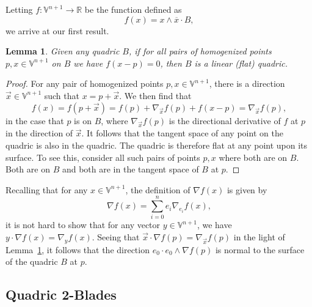 \documentclass{ecgd-l}
\newtheorem{lemma}[theorem]{Lemma}
\theoremstyle{definition}
\theoremstyle{remark}
\numberwithin{equation}{section}
\newcommand{\V}{\mathbb{V}}
\newcommand{\R}{\mathbb{R}}
\begin{document}
Letting $f:\V^{n+1}\to\R$ be the function defined as
\begin{equation}
f(x) = x\wedge\overline{x}\cdot B,
\end{equation}
we arrive at our first result.
\begin{lemma}\label{lma_flat_quadric}
Given any quadric $B$, if for all pairs of homogenized points $p,x\in\V^{n+1}$ on $B$
we have $f(x-p)=0$, then $B$ is a linear (flat) quadric.
\end{lemma}
\begin{proof}
For any pair of homogenized points $p,x\in\V^{n+1}$, there is a direction $\vec{x}\in\V^{n+1}$
such that $x=p+\vec{x}$.  We then find that
\begin{equation}
f(x) = f(p+\vec{x}) = f(p) + \nabla_{\vec{x}}f(p) + f(x-p) = \nabla_{\vec{x}}f(p),
\end{equation}
in the case that $p$ is on $B$, where $\nabla_{\vec{x}}f(p)$ is the directional
derivative of $f$ at $p$ in the direction of $\vec{x}$.  It follows that the tangent
space of any point on the quadric is also in the quadric.  The quadric is therefore
flat at any point upon its surface.  To see this, consider all such pairs of points $p,x$ where
both are on $B$.  Both are on $B$ and both are in the tangent space of $B$ at $p$.
\end{proof}
Recalling that for any $x\in\V^{n+1}$, the definition of $\nabla f(x)$ is given by
\begin{equation}
\nabla f(x) = \sum_{i=0}^n e_i\nabla_{e_i}f(x),
\end{equation}
it is not hard to show that for any vector $y\in\V^{n+1}$, we have
$y\cdot\nabla f(x)=\nabla_y f(x)$.  Seeing that $\vec{x}\cdot\nabla f(p)=\nabla_{\vec{x}}f(p)$
in the light of Lemma~\ref{lma_flat_quadric},
it follows that the direction $e_0\cdot e_0\wedge\nabla f(p)$
is normal to the surface of the quadric $B$ at $p$.

\subsection{Quadric 2-Blades}
\end{document}
